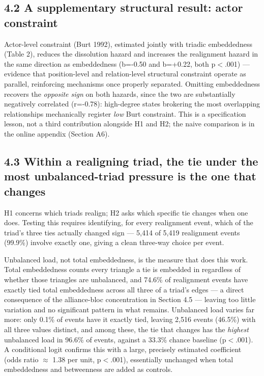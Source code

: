 \documentclass[Afour,sageh,times,doublespace]{sagej}
\begin{document}
\subsection*{4.2 A supplementary structural result: actor constraint}

Actor-level constraint (Burt 1992), estimated jointly with triadic embeddedness (Table 2), reduces the dissolution hazard and increases the realignment hazard in the same direction as embeddedness (b=-0.50 and b=+0.22, both p$<$.001) --- evidence that position-level and relation-level structural constraint operate as parallel, reinforcing mechanisms once properly separated. Omitting embeddedness recovers the \emph{opposite sign} on both hazards, since the two are substantially negatively correlated (r=-0.78): high-degree states brokering the most overlapping relationships mechanically register \emph{low} Burt constraint. This is a specification lesson, not a third contribution alongside H1 and H2; the naive comparison is in the online appendix (Section A6).

\subsection*{4.3 Within a realigning triad, the tie under the most unbalanced-triad pressure is the one that changes}

H1 concerns which triads realign; H2 asks which specific tie changes when one does. Testing this requires identifying, for every realignment event, which of the triad's three ties actually changed sign --- 5,414 of 5,419 realignment events (99.9\%) involve exactly one, giving a clean three-way choice per event.

Unbalanced load, not total embeddedness, is the measure that does this work. Total embeddedness counts every triangle a tie is embedded in regardless of whether those triangles are unbalanced, and 74.6\% of realignment events have exactly tied total embeddedness across all three of a triad's edges --- a direct consequence of the alliance-bloc concentration in Section 4.5 --- leaving too little variation and no significant pattern in what remains. Unbalanced load varies far more: only 0.1\% of events have it exactly tied, leaving 2,516 events (46.5\%) with all three values distinct, and among these, the tie that changes has the \emph{highest} unbalanced load in 96.6\% of events, against a 33.3\% chance baseline (p$<$.001). A conditional logit confirms this with a large, precisely estimated coefficient (odds ratio $\approx$ 1.38 per unit, p$<$.001), essentially unchanged when total embeddedness and betweenness are added as controls.
\end{document}
